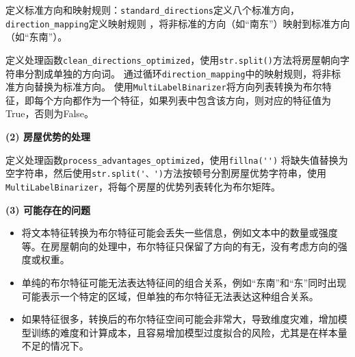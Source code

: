 \documentclass[
    report,     %
    oneside,    %
    UTF8,       %
    zihao=-4    %
]{config} %
\begin{document}
定义标准方向和映射规则：\lstinline|standard_directions|定义八个标准方向，
\lstinline|direction_mapping|定义映射规则
，将非标准的方向（如“南东”）映射到标准方向（如“东南”）。

定义处理函数\lstinline|clean_directions_optimized|，使用\lstinline|str.split()|方法将房屋朝向字符串分割成单独的方向词。
通过循环\lstinline|direction_mapping|中的映射规则，将非标准方向替换为标准方向。
使用\lstinline|MultiLabelBinarizer|将方向列表转换为布尔特征，即每个方向都作为一个特征，如果列表中包含该方向，则对应的特征值为True，否则为False。

\textbf{(2) 房屋优势的处理}

定义处理函数\lstinline|process_advantages_optimized|，使用\lstinline|fillna('')|
将缺失值替换为空字符串，然后使用\lstinline|str.split('、')|方法按顿号分割房屋优势字符串，使用\lstinline|MultiLabelBinarizer|，将每个房屋的优势列表转化为布尔矩阵。

\textbf{(3) 可能存在的问题}

\begin{itemize}
    \item 将文本特征转换为布尔特征可能会丢失一些信息，例如文本中的数量或强度等。在房屋朝向的处理中，布尔特征只保留了方向的有无，没有考虑方向的强度或权重。
    \item 单纯的布尔特征可能无法表达特征间的组合关系，例如“东南”和“东”同时出现可能表示一个特定的区域，但单独的布尔特征无法表达这种组合关系。
    \item 如果特征很多，转换后的布尔特征空间可能会非常大，导致维度灾难，增加模型训练的难度和计算成本，且容易增加模型过度拟合的风险，尤其是在样本量不足的情况下。
\end{itemize}
\end{document}
